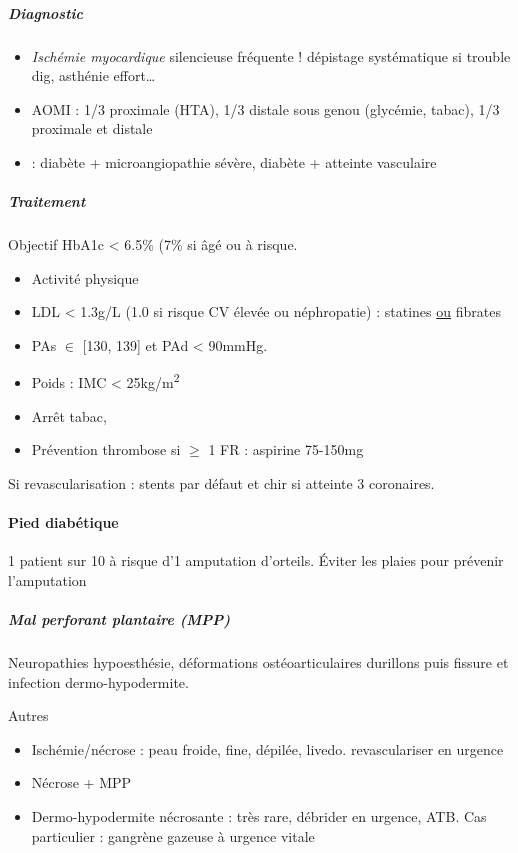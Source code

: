 \documentclass[11pt]{article}
\begin{document}
\subparagraph{Diagnostic}
\label{sec:org94d40ac}
\begin{itemize}
\item \emph{Ischémie myocardique} silencieuse fréquente ! \thus dépistage systématique si
trouble dig, asthénie effort\ldots{}
\item AOMI : 1/3 proximale (HTA), 1/3 distale sous genou (glycémie, tabac), 1/3 proximale et distale
\item : diabète + microangiopathie sévère, diabète + atteinte vasculaire
\end{itemize}

\subparagraph{Traitement}
\label{sec:org397e18d}
Objectif HbA1c < 6.5\% (7\% si âgé ou à risque.
\begin{itemize}
\item Activité physique
\item LDL < 1.3g/L (1.0 si risque CV élevée ou néphropatie) : statines \uline{ou} fibrates
\item PAs \(\in\) [130, 139] et PAd < 90mmHg.
\item Poids : IMC < 25kg/m\textsuperscript{2}
\item Arrêt tabac,
\item Prévention thrombose si \(\ge\) 1 FR : aspirine 75-150mg
\end{itemize}
Si revascularisation : stents par défaut  et chir si atteinte 3 coronaires.

\paragraph{Pied diabétique}
\label{sec:org5817b73}
1 patient sur 10 à risque d'1 amputation d'orteils. Éviter les plaies pour prévenir l'amputation

\subparagraph{Mal perforant plantaire (MPP)}
\label{sec:org4b30b5d}
Neuropathies \thus hypoesthésie, déformations ostéoarticulaires \thus durillons
puis fissure et infection \thus dermo-hypodermite.

Autres
\begin{itemize}
\item Ischémie/nécrose : peau froide, fine, dépilée, livedo. \thus revasculariser en urgence
\item Nécrose + MPP
\item Dermo-hypodermite nécrosante : très rare, \thus débrider en urgence, ATB. 
Cas particulier : gangrène gazeuse à  \thus urgence vitale \danger
\end{itemize}
\end{document}

